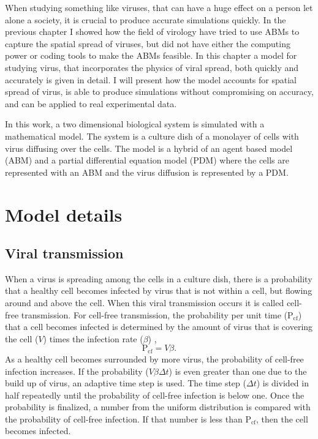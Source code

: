 When studying something like viruses, that can have a huge effect on a person let alone a society, it is crucial to produce accurate simulations quickly. In the previous chapter I showed how the field of virology have tried to use ABMs to capture the spatial spread of viruses, but did not have either the computing power or coding tools to make the ABMs feasible. In this chapter a model for studying virus, that incorporates the physics of viral spread, both quickly and accurately is given in detail. I will present how the model accounts for spatial spread of virus, is able to produce simulations without compromising on accuracy, and can be applied to real experimental data. 

In this work, a two dimensional biological system is simulated with a mathematical model. The system is a culture dish of a monolayer of cells with virus diffusing over the cells. The model is a hybrid of an agent based model (ABM) and a partial differential equation model (PDM) where the cells are represented with an ABM and the virus diffusion is represented by a PDM.

\section{Model details}

\subsection{Viral transmission} \label{Viral_transmission}

When a virus is spreading among the cells in a culture dish, there is a probability that a healthy cell becomes infected by virus that is not within a cell, but flowing around and above the cell. When this viral transmission occurs it is called cell-free transmission. For cell-free transmission, the probability per unit time ($\mathrm{P_{cf}}$) that a cell becomes infected is determined by the amount of virus that is covering the cell ($V$) times the infection rate ($\beta$) \citep{holder11autoimm}, 
$$\mathrm{P_{cf}} = V \beta.$$ 
As a healthy cell becomes surrounded by more virus, the probability of cell-free infection increases. If the probability ($V \beta \Delta t$) is even greater than one due to the build up of virus, an adaptive time step is used. The time step ($\Delta t$) is divided in half repeatedly until the probability of cell-free infection is below one. Once the probability is finalized, a number from the uniform distribution is compared with the probability of cell-free infection. If that number is less than $\mathrm{P_{cf}}$, then the cell becomes infected.

